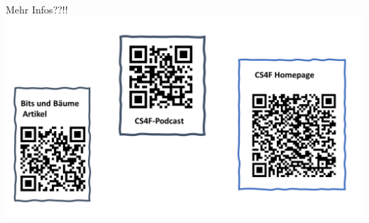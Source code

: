 \begin{frame}{Mehr Infos??!!}
\includegraphics[width=.9\textwidth]{../Figures/alle_QR_CS4F.png}

\end{frame}
